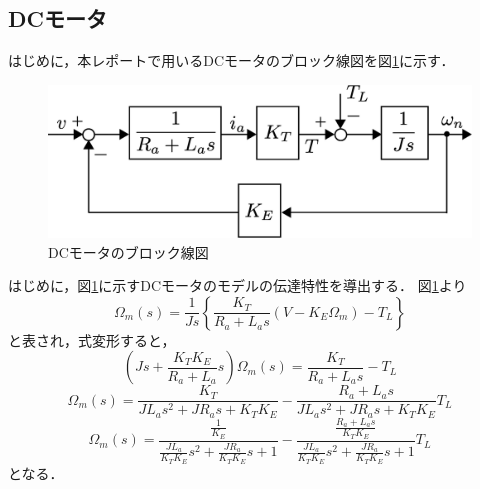 \documentclass[a4paper,12pt]{jarticle}
\begin{document}
\subsection{DCモータ}
はじめに，本レポートで用いるDCモータのブロック線図を図\ref{fig:DC_model}に示す．
%
\begin{figure}[htbp]
 \begin{center}
  \includegraphics[width = 150mm]{fig/DC_model.eps}
 \end{center}
 \caption{DCモータのブロック線図}
 \label{fig:DC_model}
\end{figure}
%
はじめに，図\ref{fig:DC_model}に示すDCモータのモデルの伝達特性を導出する．
図\ref{fig:DC_model}より
%
\begin{equation}
 \Omega_m(s)=\frac{1}{Js}\left\{\frac{K_T}{R_{a}+L_{a}s}(V-K_E\Omega_m)-T_L\right\}
\end{equation}
と表され，式変形すると，
\begin{equation*}
 \left(Js+\frac{K_{T}K_{E}}{R_{a}+L_{a}}s\right)\Omega_m(s)=\frac{K_{T}}{R_{a}+L_{a}s}-T_L
\end{equation*}
%
\begin{equation*}
 \Omega_m(s)=\frac{K_T}{JL_{a}s^2+JR_{a}s+K_TK_E}-\frac{R_{a}+L_{a}s}{JL_{a}s^2+JR_{a}s+K_TK_E}T_L
\end{equation*}
%
\begin{equation*}
 \Omega_m(s)=\frac{\frac{1}{K_E}}{\frac{JL_a}{K_{T}K_E}s^2+\frac{JR_a}{K_{T}K_E}s+1}-\frac{\frac{R_{a}+L_{a}s}{K_{T}K_E}}{\frac{JL_a}{K_{T}K_E}s^2+\frac{JR_a}{K_{T}K_E}s+1}T_L
\end{equation*}
%
となる．
\end{document}
